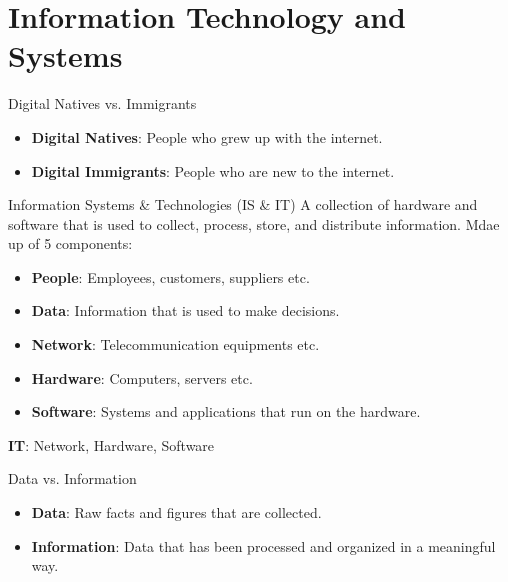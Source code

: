 
\section{Information Technology and Systems}

\begin{definition}
    {Digital Natives vs. Immigrants}
    \begin{itemize}
        \item \textbf{Digital Natives}: People who grew up with the internet.
        \item \textbf{Digital Immigrants}: People who are new to the internet.
    \end{itemize}
\end{definition}

\begin{definition}
    {Information Systems \& Technologies (IS \& IT)}
    A collection of hardware and software that is used to collect, process, store, and distribute information.
    Mdae up of 5 components:
    \begin{itemize}
        \item \textbf{People}: Employees, customers, suppliers etc.
        \item \textbf{Data}: Information that is used to make decisions.
        \item \textbf{Network}: Telecommunication equipments etc.
        \item \textbf{Hardware}: Computers, servers etc.
        \item \textbf{Software}: Systems and applications that run on the hardware.
    \end{itemize}
    \textbf{IT}: Network, Hardware, Software
\end{definition}

\begin{definition}
    {Data vs. Information}
    \begin{itemize}
        \item \textbf{Data}: Raw facts and figures that are collected.
        \item \textbf{Information}: Data that has been processed and organized in a meaningful way.
    \end{itemize}
\end{definition}

\label{def:data}